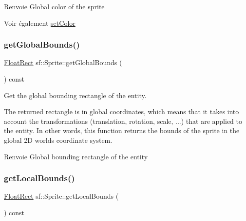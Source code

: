 \begin{DoxyReturn}{Renvoie}
Global color of the sprite
\end{DoxyReturn}
\begin{DoxySeeAlso}{Voir également}
\hyperlink{classsf_1_1Sprite_a14def44da6437bfea20c4df5e71aba4c}{set\+Color} 
\end{DoxySeeAlso}
\mbox{\label{classsf_1_1Sprite_aa795483096b90745b2e799532963e271}} 
\subsubsection{\texorpdfstring{get\+Global\+Bounds()}{getGlobalBounds()}}
{\footnotesize\ttfamily \hyperlink{classsf_1_1Rect}{Float\+Rect} sf\+::\+Sprite\+::get\+Global\+Bounds (\begin{DoxyParamCaption}{ }\end{DoxyParamCaption}) const}



Get the global bounding rectangle of the entity. 

The returned rectangle is in global coordinates, which means that it takes into account the transformations (translation, rotation, scale, ...) that are applied to the entity. In other words, this function returns the bounds of the sprite in the global 2D world\textquotesingle{}s coordinate system.

\begin{DoxyReturn}{Renvoie}
Global bounding rectangle of the entity 
\end{DoxyReturn}
\mbox{\label{classsf_1_1Sprite_ab2f4c781464da6f8a52b1df6058a48b8}} 
\subsubsection{\texorpdfstring{get\+Local\+Bounds()}{getLocalBounds()}}
{\footnotesize\ttfamily \hyperlink{classsf_1_1Rect}{Float\+Rect} sf\+::\+Sprite\+::get\+Local\+Bounds (\begin{DoxyParamCaption}{ }\end{DoxyParamCaption}) const}



